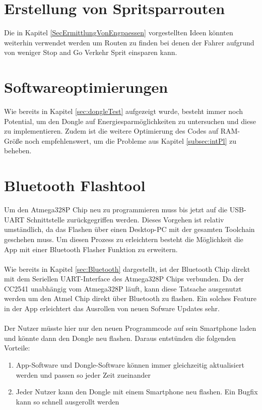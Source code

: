 \section{Erstellung von Spritsparrouten}
Die in Kapitel \ref{SecErmittlungVonEngpaessen} vorgestellten Ideen könnten weiterhin verwendet werden um Routen zu finden bei denen der Fahrer aufgrund von weniger Stop and Go Verkehr Sprit einsparen kann.

\section{Softwareoptimierungen}
Wie bereits in Kapitel \ref{sec:dongleTest} aufgezeigt wurde, besteht immer noch Potential, um den Dongle auf Energiesparmöglichkeiten zu untersuchen und diese zu implementieren. Zudem ist die weitere Optimierung des Codes auf RAM-Größe noch empfehlenswert, um die Probleme aus Kapitel \ref{subsec:intPl} zu beheben.

\section{Bluetooth Flashtool}
\label{sec:appAusblick}
Um den Atmega328P Chip neu zu programmieren muss bis jetzt auf die USB-UART Schnittstelle zurückgegriffen werden. Dieses Vorgehen ist relativ umständlich, da das Flashen über einen Desktop-PC mit der gesamten Toolchain geschehen muss. Um diesen Prozess zu erleichtern besteht die Möglichkeit die App mit einer Bluetooth Flasher Funktion zu erweitern.
\paragraph{}
Wie bereits in Kapitel \ref{sec:Bluetooth} dargestellt, ist der Bluetooth Chip direkt mit dem Seriellen UART-Interface des Atmega328P Chips verbunden. Da der CC2541 unabhängig vom Atmega328P läuft, kann diese Tatsache ausgenutzt werden um den Atmel Chip direkt über Bluetooth zu flashen. Ein solches Feature in der App erleichtert das Ausrollen von neuen Sofware Updates sehr.
\paragraph{}
Der Nutzer müsste hier nur den neuen Programmcode auf sein Smartphone laden und könnte dann den Dongle neu flashen.
Daraus entstünden die folgenden Vorteile:
\begin{enumerate}
	\item App-Software und Dongle-Software können immer gleichzeitig aktualisiert werden und passen so jeder Zeit zueinander
	\item Jeder Nutzer kann den Dongle mit einem Smartphone neu flashen. Ein Bugfix kann so schnell ausgerollt werden
\end{enumerate}
